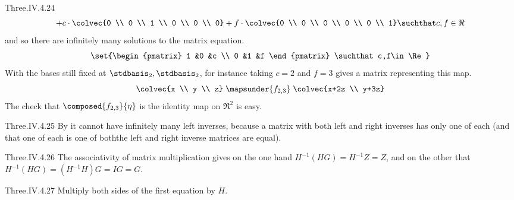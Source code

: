\begin{ans}{Three.IV.4.24}
\begin{equation*}
{              +c\cdot \colvec{0 \\ 0 \\ 1 \\ 0 \\ 0 \\ 0}
              +f\cdot \colvec{0 \\ 0 \\ 0 \\ 0 \\ 0 \\ 1}
             \suchthat c,f\in\Re}
      \end{equation*}
      and so there are infinitely many solutions to the matrix equation.
      \begin{equation*}
        \set{\begin{pmatrix}
               1  &0  &c  \\
               0  &1  &f
             \end{pmatrix}
             \suchthat c,f\in\Re}
      \end{equation*}
      With the bases still fixed at $\stdbasis_2,\stdbasis_2$,
      for instance taking $c=2$ and
      $f=3$ gives a matrix representing this map.
      \begin{equation*}
        \colvec{x \\ y \\ z}
        \;\mapsunder{f_{2,3}}\;
        \colvec{x+2z \\ y+3z}
      \end{equation*}
      The check that $\composed{f_{2,3}}{\eta}$ is the identity map on
      $\Re^2$ is easy.
    
\end{ans}
\begin{ans}{Three.IV.4.25}
      By  it cannot have infinitely many
      left inverses, because
      a matrix with both left and right inverses has only one of each (and
      that one of each is one of both\Dash the left and right inverse matrices
      are equal).
    
\end{ans}
\begin{ans}{Three.IV.4.26}
      The associativity of matrix multiplication gives
      on the one hand
      \( H^{-1}(HG)=H^{-1}Z=Z \), and on the other that
      \( H^{-1}(HG)=(H^{-1}H)G=IG=G \).
    
\end{ans}
\begin{ans}{Three.IV.4.27}
       Multiply both sides of the first equation by $H$.
    
\end{ans}
